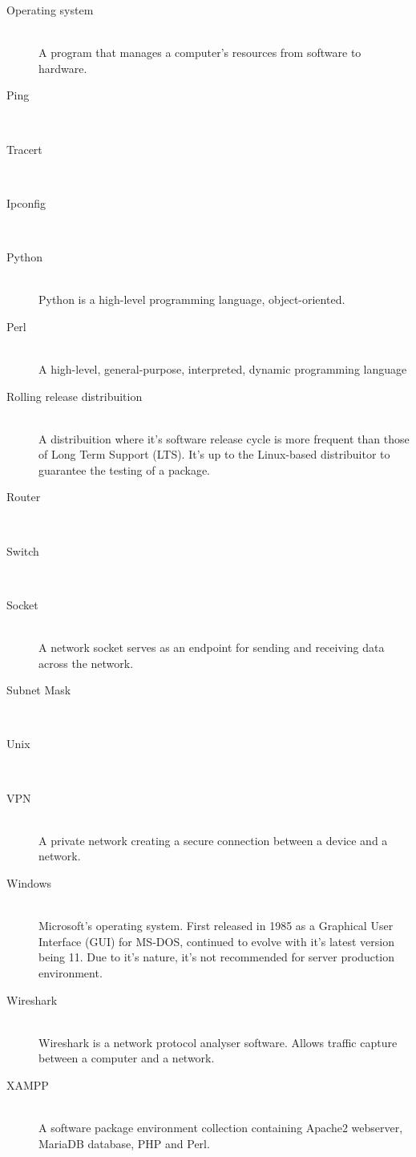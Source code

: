 \documentclass[11pt,a4paper]{report}
\begin{document}
\begin{description}
        \item[Operating system] \hfill \\
            A program that manages a computer's resources from software to hardware.
        \item[Ping] \hfill \\
        \item[Tracert] \hfill \\
        \item[Ipconfig] \hfill \\
        \item[Python] \hfill \\
            Python is a high-level programming language, object-oriented.
        \item[Perl] \hfill \\
            A high-level, general-purpose, interpreted, dynamic programming language
        \item[Rolling release distribuition] \hfill \\
            A distribuition where it's software release cycle is more frequent than those of Long Term Support (LTS). It's up to the Linux-based distribuitor to guarantee the testing of a package.
        \item[Router] \hfill \\
        \item[Switch] \hfill \\
        \item[Socket] \hfill \\
            A network socket serves as an endpoint for sending and receiving data across the network.
        \item[Subnet Mask] \hfill \\
        \item[Unix] \hfill \\
        \item[VPN] \hfill \\
            A private network creating a secure connection between a device and a network.
        \item[Windows] \hfill \\
            Microsoft's operating system. First released in 1985 as a Graphical User Interface (GUI) for MS-DOS, continued to evolve with it's latest version being 11.
            Due to it's nature, it's not recommended for server production environment.
        \item[Wireshark] \hfill \\
            Wireshark is a network protocol analyser software. Allows traffic capture between a computer and a network.
        \item[XAMPP] \hfill \\
            A software package environment collection containing Apache2 webserver, MariaDB database, PHP and Perl.
    \end{description}
\end{document}
